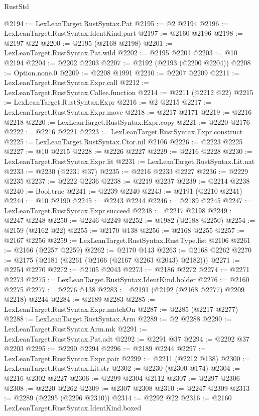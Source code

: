 \begin{lexlean}{RustStd}
\begin{coremodule}
@2194 := LexLeanTarget.RustSyntax.Pat
@2195 := @2 @2194
@2196 := LexLeanTarget.RustSyntax.IdentKind.part
@2197 := @2160 @2196
@2198 := @2197 @22
@2200 := @2195 (@2168 @2198)
@2201 := LexLeanTarget.RustSyntax.Pat.wild
@2202 := @2195 @2201
@2203 := @10 @2194
@2204 := @2202 @2203
@2207 := @2192 (@2193 (@2200 @2204))
@2208 := Option.none.{0}
@2209 := @2208 @1991
@2210 := @2207 @2209
@2211 := LexLeanTarget.RustSyntax.Expr.call
@2212 := LexLeanTarget.RustSyntax.Callee.function
@2214 := @2211 (@2212 @22)
@2215 := LexLeanTarget.RustSyntax.Expr
@2216 := @2 @2215
@2217 := LexLeanTarget.RustSyntax.Expr.move
@2218 := @2217 @2171
@2219 := @2216 @2218
@2220 := LexLeanTarget.RustSyntax.Expr.copy
@2221 := @2220 @2176
@2222 := @2216 @2221
@2223 := LexLeanTarget.RustSyntax.Expr.construct
@2225 := LexLeanTarget.RustSyntax.Ctor.nil @2106
@2226 := @2223 @2225
@2227 := @10 @2215
@2228 := @2226 @2227
@2229 := @2216 @2228
@2230 := LexLeanTarget.RustSyntax.Expr.lit
@2231 := LexLeanTarget.RustSyntax.Lit.nat
@2233 := @2230 (@2231 @37)
@2235 := @2216 @2233 @2227
@2236 := @2229 @2235
@2237 := @2222 @2236
@2238 := @2219 @2237
@2239 := @2214 @2238
@2240 := Bool.true
@2241 := @2239 @2240
@2243 := @2191 (@2210 @2241)
@2244 := @10 @2190
@2245 := @2243 @2244
@2246 := @2189 @2245
@2247 := LexLeanTarget.RustSyntax.Expr.succeed
@2248 := @2217 @2198
@2249 := @2247 @2248
@2250 := @2246 @2249
@2252 := @1982 (@2188 @2250)
@2254 := @2159 (@2162 @22)
@2255 := @2170 @138
@2256 := @2168 @2255
@2257 := @2167 @2256
@2259 := LexLeanTarget.RustSyntax.RustType.list @2106
@2261 := @2166 (@2257 @2259)
@2262 := @2170 @143
@2263 := @2168 @2262
@2270 := @2175 (@2181 (@2261 (@2166 (@2167 @2263 @2043) @2182)))
@2271 := @2254 @2270
@2272 := @2105 @2043
@2273 := @2186 @2272
@2274 := @2271 @2273
@2275 := LexLeanTarget.RustSyntax.IdentKind.holder
@2276 := @2160 @2275
@2277 := @2276 @138
@2283 := @2191 (@2192 (@2168 @2277) @2209 @2218) @2244
@2284 := @2189 @2283
@2285 := LexLeanTarget.RustSyntax.Expr.matchOn
@2287 := @2285 (@2217 @2277)
@2288 := LexLeanTarget.RustSyntax.Arm
@2289 := @2 @2288
@2290 := LexLeanTarget.RustSyntax.Arm.mk
@2291 := LexLeanTarget.RustSyntax.Pat.adt
@2292 := @2291 @37
@2294 := @2292 @37 @2203
@2295 := @2290 @2294
@2296 := @2189 @2244
@2297 := LexLeanTarget.RustSyntax.Expr.pair
@2299 := @2211 (@2212 @138)
@2300 := LexLeanTarget.RustSyntax.Lit.str
@2302 := @2230 (@2300 @174)
@2304 := @2216 @2302 @2227
@2306 := @2299 @2304 @2112
@2307 := @2297 @2306
@2308 := @2220 @2262
@2309 := @2307 @2308
@2310 := @2247 @2309
@2313 := @2289 (@2295 (@2296 @2310))
@2314 := @2292 @22
@2316 := @2160 LexLeanTarget.RustSyntax.IdentKind.boxed

\end{coremodule}
\end{lexlean}

